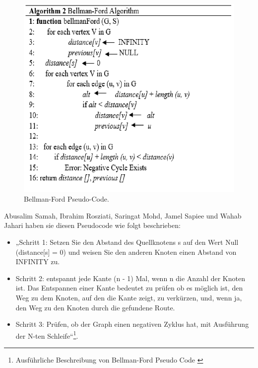  \begin{figure}[H]
	\centering
	\includegraphics[width=1.0\textwidth]{images/Bellman-Ford-Algorithmus_Pseudo-Code.PNG}
	\caption{\label{fig:Bellman}Bellman-Ford Pseudo-Code\cite{Abusalim2020}.}
\end{figure}
Abusalim Samah, Ibrahim Rosziati, Saringat Mohd, Jamel Sapiee und Wahab Jahari haben sie diesen Pseudocode wie folgt beschrieben:
\newline
\newline
\begin{itemize}
	\item   „Schritt 1: Setzen Sie den Abstand des Quellknotens s auf den Wert Null (distance[s] = 0) und weisen Sie den anderen Knoten einen Abstand von INFINITY zu. 
	\item Schritt 2: entspannt jede Kante (n - 1) Mal, wenn n die Anzahl der Knoten ist. Das Entspannen einer Kante bedeutet zu prüfen ob es möglich ist, den Weg zu dem Knoten, auf den die Kante zeigt, zu verkürzen, und, wenn ja, den Weg zu den Knoten durch die gefundene Route. 
	\item Schritt 3: Prüfen, ob der Graph einen negativen Zyklus hat, mit Ausführung der N-ten Schleife“\footnote{Ausführliche Beschreibung von Bellman-Ford Pseudo Code \cite{Abusalim2020}}.
\end{itemize}







